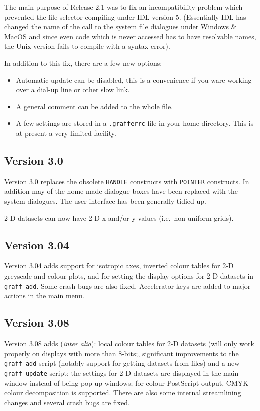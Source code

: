 \documentclass[11pt,twoside,english]{article}
\begin{document}
The main purpose of Release 2.1 was to fix an incompatibility problem
which prevented the file selector compiling under IDL version
5. (Essentially IDL has changed the name of the call to the system file
dialogues under Windows \& MacOS and since even code which is never
accessed has to have resolvable names, the Unix version fails to
compile with a syntax error).

In addition to this fix, there are a few new options:

\begin{itemize}
\item Automatic update can be disabled, this is a convenience if you
  ware working over a dial-up line or other slow link.
\item A general comment can be added to the whole file.
\item A few settings are stored in a \texttt{.grafferrc} file in your
  home directory. This is at present a very limited facility.
\end{itemize}


\subsection{Version 3.0}
\label{sec:v3.00}

Version 3.0 replaces the obsolete \texttt{HANDLE} constructs with
\texttt{POINTER} constructs. In addition may of the home-made dialogue
boxes have been replaced with the system dialogues. The user interface
has been generally tidied up.

2-D datasets can now have 2-D x and/or y values (i.e.\ non-uniform
grids).

\subsection{Version 3.04}
\label{sec:v3.04}

Version 3.04 adds support for isotropic axes, inverted colour tables
for 2-D greyscale and colour plots, and for setting the display options
for 2-D datasets in \texttt{graff\_add}. Some crash bugs are also
fixed. Accelerator keys are added to major actions in the main menu.

\subsection{Version 3.08}
\label{sec:v308}

Version 3.08 adds (\textit{inter alia}): local colour tables for 2-D
datasets (will only work properly on displays with more than 8-bits;,
significant improvements to the \texttt{graff\_add} script (notably
support for getting datasets from files) and a new
\texttt{graff\_update} script; the settings for 2-D datasets are
displayed in the main window instead of being pop up windows; for
colour PostScript output, CMYK colour decomposition is supported. There
are also some internal streamlining changes and several crash bugs are
fixed.
\end{document}

